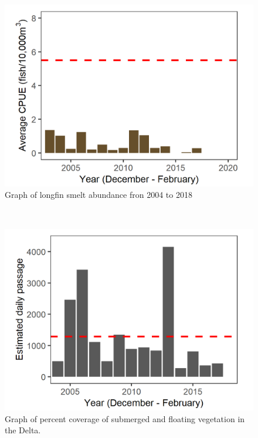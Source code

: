 \documentclass[
]{book}
\begin{document}
\begin{panel-grid}
\begin{columns-nocenter}
\begin{column800}
\begin{expand}
\begin{figure}
\includegraphics[width=15.25in]{figures/lonsme_plot_recent} \caption{Graph of longfin smelt abundance fron 2004 to 2018}\label{fig:unnamed-chunk-183}
\end{figure}

\end{expand}

\end{column800}

\begin{column40}

~

\end{column40}

\begin{column800}

\begin{expand}

\begin{figure}
\includegraphics[width=15.25in]{figures/redbluff_2003} \caption{Graph of percent coverage of submerged and floating vegetation in the Delta.}\label{fig:unnamed-chunk-184}
\end{figure}


\end{expand}
\end{column800}
\end{columns-nocenter}
\end{panel-grid}
\end{document}
